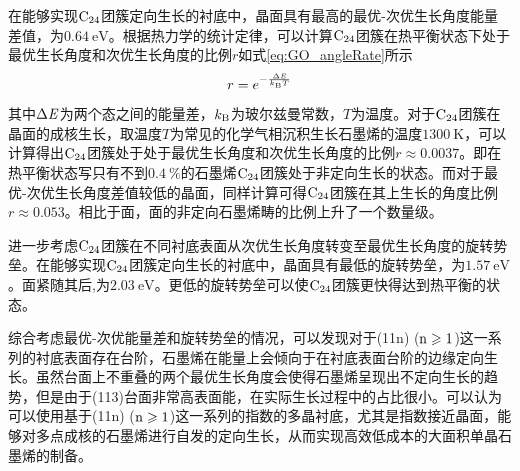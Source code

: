 在能够实现$\rm{C_{24}}$团簇定向生长的衬底中，晶面具有最高的最优-次优生长角度能量差值，为$\SI{0.64 }{\electronvolt}$。根据热力学的统计定律，可以计算$\rm{C_{24}}$团簇在热平衡状态下处于最优生长角度和次优生长角度的比例$r$如式\eqref{eq:GO_angleRate}所示\chinesecolon
\begin{equation}
    \label{eq:GO_angleRate}
    r=e^{-\frac{\rm{\Delta} \it E}{k_{\rm B}T}}
\end{equation}
其中$\rm{\Delta} \it E$为两个态之间的能量差，$k_{\rm B}$为玻尔兹曼常数，$T$为温度。对于$\rm{C_{24}}$团簇在晶面的成核生长，取温度$T$为常见的化学气相沉积生长石墨烯的温度$\SI{1300 }{\kelvin}$，可以计算得出$\rm{C_{24}}$团簇处于处于最优生长角度和次优生长角度的比例$r\approx 0.0037$。即在热平衡状态写只有不到$\SI{0.4}{\percent}$的石墨烯$\rm{C_{24}}$团簇处于非定向生长的状态。而对于最优-次优生长角度差值较低的晶面，同样计算可得$\rm{C_{24}}$团簇在其上生长的角度比例$r\approx 0.053$。相比于面，面的非定向石墨烯畴的比例上升了一个数量级。


进一步考虑$\rm{C_{24}}$团簇在不同衬底表面从次优生长角度转变至最优生长角度的旋转势垒。在能够实现$\rm{C_{24}}$团簇定向生长的衬底中，晶面具有最低的旋转势垒，为$\SI{1.57 }{\electronvolt}$。面紧随其后,为$\SI{2.03 }{\electronvolt}$。更低的旋转势垒可以使$\rm{C_{24}}$团簇更快得达到热平衡的状态。

综合考虑最优-次优能量差和旋转势垒的情况，可以发现对于(11n) ($\rm{n \geqslant 1}$)这一系列的衬底表面存在台阶，石墨烯在能量上会倾向于在衬底表面台阶的边缘定向生长。虽然台面上不重叠的两个最优生长角度会使得石墨烯呈现出不定向生长的趋势，但是由于(113)台面非常高表面能，在实际生长过程中的占比很小。可以认为可以使用基于(11n) ($\rm{n \geqslant 1}$)这一系列的指数的多晶衬底，尤其是指数接近晶面，能够对多点成核的石墨烯进行自发的定向生长，从而实现高效低成本的大面积单晶石墨烯的制备。

